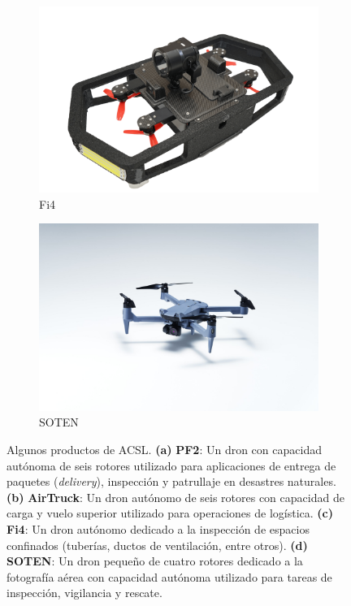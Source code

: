 \begin{figure}
\begin{subfigure}[b]{0.45\textwidth}
        \includegraphics[width=\textwidth]{partes/img/Fi4.png}
        \caption{Fi4}
        \label{fig:Fi4}
    \end{subfigure}
    \hfill
    \begin{subfigure}[b]{0.45\textwidth}
        \centering
        \includegraphics[width=\textwidth]{partes/img/SOTEN.jpg}
        \caption{SOTEN}
        \label{fig:SOTEN_ACSL}
    \end{subfigure}
    \hfill
    
    \caption [Algunos productos de ACSL]{Algunos productos de ACSL. \textbf{(a)} \textbf{PF2}: Un dron con capacidad autónoma de seis rotores utilizado para aplicaciones de entrega de paquetes (\textit{delivery}), inspección y patrullaje en desastres naturales. \textbf{(b)} \textbf{AirTruck}: Un dron autónomo de seis rotores con capacidad de carga y vuelo superior utilizado para operaciones de logística. \textbf{(c)} \textbf{Fi4}: Un dron autónomo dedicado a la inspección de espacios confinados (tuberías, ductos de ventilación, entre otros). \textbf{(d)} \textbf{SOTEN}: Un dron pequeño de cuatro rotores dedicado a la fotografía aérea con capacidad autónoma utilizado para tareas de inspección, vigilancia y rescate. }
    \label{fig:acsl-products}
\end{figure}


